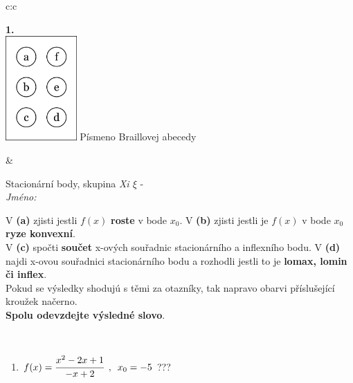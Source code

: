 \documentclass[10pt]{report}
\begin{document}
\begin{tabular}{c:c}
\begin{minipage}[c][104.5mm][t]{0.5\linewidth}
\begin{center}
\begin{minipage}{0.79\linewidth}
\end{minipage}
\begin{minipage}{0.20\linewidth}
\begin{center}
{\Huge\bfseries 1.} \\[2mm]
\includegraphics[height=40mm]{../images/braille.png}
{\small Písmeno Braillovej abecedy}
\end{center}
\end{minipage}
\end{center}
\end{minipage}
&
\begin{minipage}[c][104.5mm][t]{0.5\linewidth}
\begin{center}
\vspace{7mm}
{\huge Stacionární body, skupina \textit{Xi $\xi$} -}\\[5mm]
\textit{Jméno:}\phantom{xxxxxxxxxxxxxxxxxxxxxxxxxxxxxxxxxxxxxxxxxxxxxxxxxxxxxxxxxxxxxxxxx}\\[5mm]
\begin{minipage}{0.95\linewidth}
\begin{center}
{\small V \textbf{(a)} zjisti jestli $f(x)$ \textbf{roste} v bode $x_0$. V \textbf{(b)} zjisti jestli je $f(x)$ v bode $x_0$ \textbf{ryze konvexní}.\\V \textbf{(c)} spočti \textbf{součet} x-ových souřadnic stacionárního a inflexního bodu. V \textbf{(d)} najdi x-ovou souřadnici stacionárního bodu a rozhodli jestli to je \textbf{lomax, lomin či inflex}.\\Pokud se výsledky shodujú s těmi za otazníky, tak napravo obarvi příslušející kroužek načerno.\\\textbf{Spolu odevzdejte výsledné slovo}}.
\end{center}
\end{minipage}
\\[1mm]
\begin{minipage}{0.79\linewidth}
\begin{center}
\begin{varwidth}{\linewidth}
\begin{enumerate}
\normalsize
\item $f(x)=\cfrac{x^2-2x+1}{-x+2}\enspace , \enspace x_0=-5$\quad \dotfill\; ???\;\dotfill \quad {}

\end{enumerate}
\end{varwidth}
\end{center}
\end{minipage}
\end{center}
\end{minipage}
\end{tabular}
\end{document}
